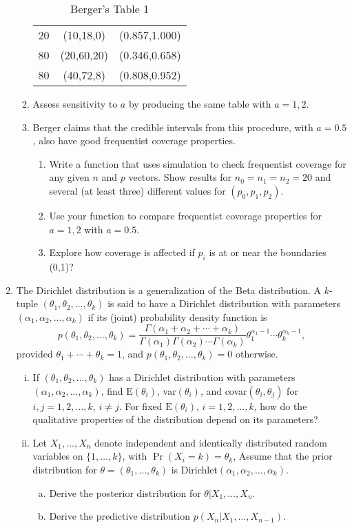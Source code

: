 \documentclass[12pt]{article}
\def\G{\Gamma}
\def\t{\theta}
\def\a{\alpha}
\def\E{\mbox{E}}
\begin{document}
\begin{enumerate}
\begin{enumerate}
\begin{table}[h!]
\begin{center}
\begin{tabular}{c|c|c}
20 & (10,18,0) & (0.857,1.000) \\
80 & (20,60,20) & (0.346,0.658) \\
80 & (40,72,8) & (0.808,0.952)
\end{tabular}
\end{center}
\caption{Berger's Table 1}
\end{table}
\item Assess sensitivity to $a$ by producing the same table with $a=1,2$. 
\item Berger claims that the credible intervals from this procedure, with $a=0.5$, also have good frequentist coverage properties.
\begin{enumerate}
\item Write a function that uses simulation to check frequentist coverage for any given
$n$ and $p$ vectors. Show results for $n_0=n_1=n_2=20$ and 
several (at least three) different values for $(p_0,p_1,p_2)$. 
\item Use your function to compare frequentist coverage properties for $a=1,2$ with $a=0.5$. 
\item Explore how coverage is affected if  $p_i$ is at or near the boundaries (0,1)? 
\end{enumerate}
\end{enumerate}

\item The Dirichlet distribution is a generalization of the Beta distribution.  
A $k$-tuple $(\t_1,\t_2,\ldots,\t_k)$ is said to have a Dirichlet distribution with parameters $(\a_1,\a_2,\ldots,\a_k)$ if its (joint) probability density function is
$$p(\t_1,\t_2,\ldots,\t_k) = \frac{\G(\a_1+\a_2+\cdots+\a_k)}{\G(\a_1) \G(\a_2) \cdots \G(\a_k)} \t_1^{\a_1-1}\cdots \t_k^{\a_k-1},$$
provided $\t_1+\cdots+\t_k=1$, and $p(\t_1,\t_2,\ldots,\t_k) = 0$ otherwise.

\begin{enumerate}[i)]
\item If  $(\t_1,\t_2,\ldots,\t_k)$ has a Dirichlet distribution with parameters $(\a_1,\a_2,\ldots,\a_k)$, find $\E(\t_i)$, var$(\t_i)$, and covar$(\t_i,\t_j)$ for $i,j = 1,2, \ldots,k$, $i\ne j$.  For fixed $\E(\t_i)$, $i = 1,2, \ldots,k$, how do the qualitative properties of the distribution depend on its parameters?
\item Let $X_1,\dots,X_n$ denote independent and identically distributed random variables on $\{1,\dots,k\}$, with $\Pr(X_i=k) = \t_k$,
Assume that the prior distribution for $\t=(\t_1,\dots,\t_k)$ is Dirichlet$(\a_1,\a_2,\ldots,\a_k)$. 
\begin{enumerate}[a)]
\item Derive the posterior distribution for $\t | X_1,\dots,X_n$.
\item Derive the predictive distribution $p(X_n | X_1,\dots,X_{n-1})$.
\end{enumerate} 
\end{enumerate}


\end{enumerate}
\end{document}
